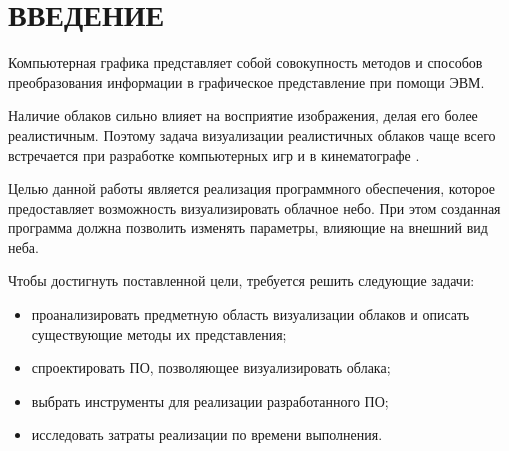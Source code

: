 \chapter*{ВВЕДЕНИЕ}

Компьютерная графика представляет собой совокупность методов
и способов преобразования информации в графическое представление при
помощи ЭВМ.

Наличие облаков сильно влияет на восприятие изображения, делая его более реалистичным. Поэтому задача визуализации реалистичных облаков чаще всего встречается при разработке компьютерных игр и в кинематографе \cite{oz, hzd, frostbite}. 

Целью данной работы является реализация программного обеспечения, которое предоставляет возможность визуализировать облачное небо. При этом созданная программа должна позволить изменять параметры, влияющие на внешний вид неба.

Чтобы достигнуть поставленной цели, требуется решить следующие задачи:

\begin{itemize}
	\item проанализировать предметную область визуализации облаков и описать существующие методы их представления;
	\item спроектировать ПО, позволяющее визуализировать облака;
	\item выбрать инструменты для реализации разработанного ПО;
	\item исследовать затраты реализации по времени выполнения.
\end{itemize}